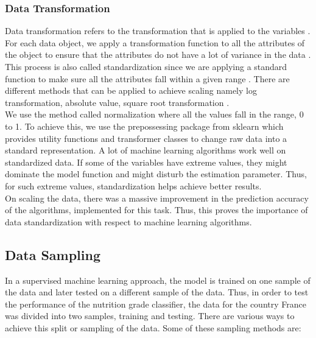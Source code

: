 \documentclass[sigconf]{acmart}
\begin{document}
\subsubsection{Data Transformation} 
Data transformation refers to the transformation that is applied to the variables \cite{book-tan}. For each data object, we apply a transformation function to all the attributes of the object to ensure that the attributes do not have a lot of variance in the data \cite{book-tan}. This process is also called standardization since we are applying a standard function to make sure all the attributes fall within a given range \cite{book-tan}. There are different methods that can be applied to achieve scaling namely log transformation, absolute value, square root transformation \cite{book-tan}. \\

We use the method called normalization where all the values fall in the range, 0 to 1. To achieve this, we use the prepossessing package from sklearn which provides utility functions and transformer classes to change raw data into a standard representation. A lot of machine learning algorithms work well on standardized data. If some of the variables have extreme values, they might dominate the model function and might disturb the estimation parameter. Thus, for such extreme values, standardization helps achieve better results. \\

On scaling the data, there was a massive improvement in the prediction accuracy of the algorithms, implemented for this task. Thus, this proves the importance of data standardization with respect to machine learning algorithms.

\subsection{Data Sampling}
In a supervised machine learning approach, the model is trained on one sample of the data and later tested on a different sample of the data. Thus, in order to test the performance of the nutrition grade classifier, the data for the country France was divided into two samples, training and testing. There are various ways to achieve this split or sampling of the data. Some of these sampling methods are:
\end{document}
